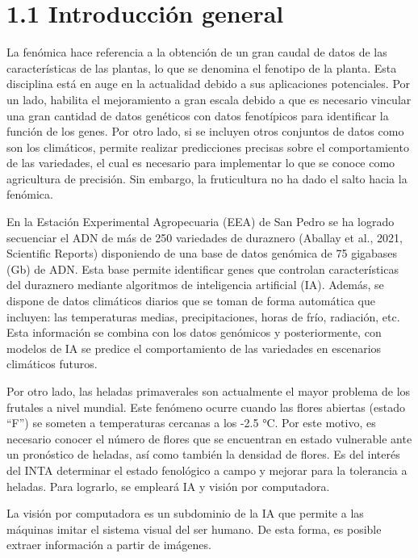 \documentclass[
11pt, %
]{charter}
\begin{document}
\section{1.1 Introducción general}
\label{sec:descripcion}

La fenómica hace referencia a la obtención de un gran caudal de datos de las características de las plantas, lo que se denomina el fenotipo de la planta. Esta disciplina está en auge en la actualidad debido a sus aplicaciones potenciales. Por un lado, habilita el mejoramiento a gran escala debido a que es necesario vincular una gran cantidad de datos genéticos con datos fenotípicos para identificar la función de los genes. Por otro lado, si se incluyen otros conjuntos de datos como son los climáticos, permite realizar predicciones precisas sobre el comportamiento de las variedades, el cual es necesario para implementar lo que se conoce como agricultura de precisión. Sin embargo, la fruticultura no ha dado el salto hacia la fenómica.

En la  Estación Experimental Agropecuaria (EEA) de San Pedro se ha logrado secuenciar el ADN de más de 250 variedades de duraznero (Aballay et al., 2021, Scientific Reports) disponiendo de una base de datos genómica de 75 gigabases (Gb) de ADN. Esta base permite identificar genes que controlan características del duraznero mediante algoritmos de inteligencia artificial (IA). Además, se dispone de datos climáticos diarios que se toman de forma automática que incluyen: las temperaturas medias, precipitaciones, horas de frío, radiación, etc. Esta información se combina con los datos genómicos y posteriormente, con modelos de IA se predice el comportamiento de las variedades en escenarios climáticos futuros.

Por otro lado, las heladas primaverales son actualmente el mayor problema de los frutales a nivel mundial. Este fenómeno ocurre cuando las flores abiertas (estado “F”) se someten a temperaturas cercanas a los -2.5 °C. Por este motivo, es necesario conocer el número de flores que se encuentran en estado vulnerable ante un pronóstico de heladas, así como también la densidad de flores. Es del interés del INTA determinar el estado fenológico a campo y mejorar para la tolerancia a heladas. Para lograrlo, se empleará IA y visión por computadora.

La visión por computadora es un subdominio de la IA que permite a las máquinas imitar el sistema visual del ser humano. De esta forma, es posible extraer información a partir de imágenes. 
\end{document}
